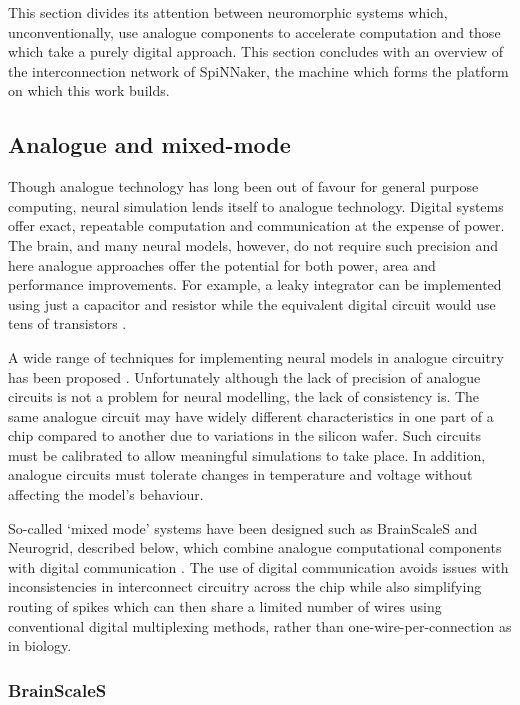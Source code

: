 		This section divides its attention between neuromorphic systems which,
		unconventionally, use analogue components to accelerate computation and
		those which take a purely digital approach. This section concludes with an
		overview of the interconnection network of SpiNNaker, the machine which
		forms the platform on which this work builds.
		
		\subsection{Analogue and mixed-mode}
			
			Though analogue technology has long been out of favour for general purpose
			computing, neural simulation lends itself to analogue technology.  Digital
			systems offer exact, repeatable computation and communication at the
			expense of power. The brain, and many neural models, however, do not
			require such precision and here analogue approaches offer the potential
			for both power, area and performance improvements. For example, a leaky
			integrator can be implemented using just a capacitor and resistor while
			the equivalent digital circuit would use tens of transistors
			\cite{misra10}.
			
			A wide range of techniques for implementing neural models in analogue
			circuitry has been proposed \cite{graf86,holler89,agranat90,azghadi13}.
			Unfortunately although the lack of precision of analogue circuits is not a
			problem for neural modelling, the lack of consistency is. The same
			analogue circuit may have widely different characteristics in one part of
			a chip compared to another due to variations in the silicon wafer. Such
			circuits must be calibrated to allow meaningful simulations to take place.
			In addition, analogue circuits must tolerate changes in temperature and
			voltage without affecting the model's behaviour.
			
			So-called `mixed mode' systems have been designed such as BrainScaleS and
			Neurogrid, described below, which combine analogue computational
			components with digital communication \cite{maguire07,benjamin14}. The use
			of digital communication avoids issues with inconsistencies in
			interconnect circuitry across the chip while also simplifying routing of
			spikes which can then share a limited number of wires using conventional
			digital multiplexing methods, rather than one-wire-per-connection as in
			biology.
			
			\subsubsection{BrainScaleS}
				
